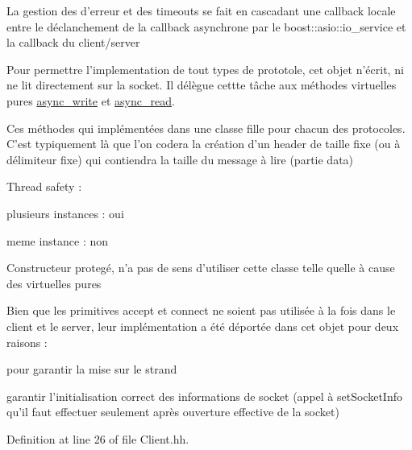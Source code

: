 La gestion des d'erreur et des timeouts se fait en cascadant une callback locale entre le déclanchement de la callback asynchrone par le boost\-::asio\-::io\-\_\-service et la callback du client/server

Pour permettre l'implementation de tout types de prototole, cet objet n'écrit, ni ne lit directement sur la socket. Il délègue cettte tâche aux méthodes virtuelles pures \hyperlink{classxtd_1_1network_1_1base_1_1Connection_a650bc7e13969ff9195c95307e0abb2e4}{async\-\_\-write} et \hyperlink{classxtd_1_1network_1_1base_1_1Connection_ab468f8470260b0ce42b5accf29c352e6}{async\-\_\-read}.

Ces méthodes qui implémentées dans une classe fille pour chacun des protocoles. C'est typiquement là que l'on codera la création d'un header de taille fixe (ou à délimiteur fixe) qui contiendra la taille du message à lire (partie data)


\begin{DoxyItemize}
\item Thread safety \-:
\begin{DoxyItemize}
\item plusieurs instances \-: oui
\item meme instance \-: non
\end{DoxyItemize}
\item Constructeur protegé, n'a pas de sens d'utiliser cette classe telle quelle à cause des virtuelles pures
\item Bien que les primitives accept et connect ne soient pas utilisée à la fois dans le client et le server, leur implémentation a été déportée dans cet objet pour deux raisons \-:
\begin{DoxyItemize}
\item pour garantir la mise sur le strand
\item garantir l'initialisation correct des informations de socket (appel à set\-Socket\-Info qu'il faut effectuer seulement après ouverture effective de la socket) 
\end{DoxyItemize}
\end{DoxyItemize}

Definition at line 26 of file Client.\-hh.



